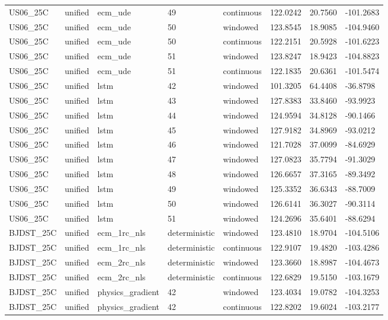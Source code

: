 \begin{tabular}{llllllll}
US06\_25C & unified & ecm\_ude & 49 & continuous & 122.0242 & 20.7560 & -101.2683 \\
US06\_25C & unified & ecm\_ude & 50 & windowed & 123.8545 & 18.9085 & -104.9460 \\
US06\_25C & unified & ecm\_ude & 50 & continuous & 122.2151 & 20.5928 & -101.6223 \\
US06\_25C & unified & ecm\_ude & 51 & windowed & 123.8247 & 18.9423 & -104.8823 \\
US06\_25C & unified & ecm\_ude & 51 & continuous & 122.1835 & 20.6361 & -101.5474 \\
US06\_25C & unified & lstm & 42 & windowed & 101.3205 & 64.4408 & -36.8798 \\
US06\_25C & unified & lstm & 43 & windowed & 127.8383 & 33.8460 & -93.9923 \\
US06\_25C & unified & lstm & 44 & windowed & 124.9594 & 34.8128 & -90.1466 \\
US06\_25C & unified & lstm & 45 & windowed & 127.9182 & 34.8969 & -93.0212 \\
US06\_25C & unified & lstm & 46 & windowed & 121.7028 & 37.0099 & -84.6929 \\
US06\_25C & unified & lstm & 47 & windowed & 127.0823 & 35.7794 & -91.3029 \\
US06\_25C & unified & lstm & 48 & windowed & 126.6657 & 37.3165 & -89.3492 \\
US06\_25C & unified & lstm & 49 & windowed & 125.3352 & 36.6343 & -88.7009 \\
US06\_25C & unified & lstm & 50 & windowed & 126.6141 & 36.3027 & -90.3114 \\
US06\_25C & unified & lstm & 51 & windowed & 124.2696 & 35.6401 & -88.6294 \\
BJDST\_25C & unified & ecm\_1rc\_nls & deterministic & windowed & 123.4810 & 18.9704 & -104.5106 \\
BJDST\_25C & unified & ecm\_1rc\_nls & deterministic & continuous & 122.9107 & 19.4820 & -103.4286 \\
BJDST\_25C & unified & ecm\_2rc\_nls & deterministic & windowed & 123.3660 & 18.8987 & -104.4673 \\
BJDST\_25C & unified & ecm\_2rc\_nls & deterministic & continuous & 122.6829 & 19.5150 & -103.1679 \\
BJDST\_25C & unified & physics\_gradient & 42 & windowed & 123.4034 & 19.0782 & -104.3253 \\
BJDST\_25C & unified & physics\_gradient & 42 & continuous & 122.8202 & 19.6024 & -103.2177 \\

\end{tabular}

